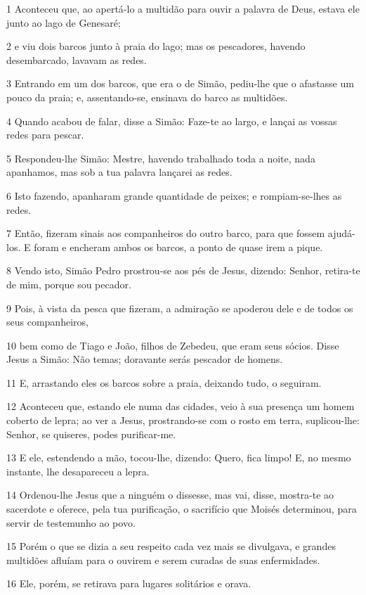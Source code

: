 \par 1 Aconteceu que, ao apertá-lo a multidão para ouvir a palavra de Deus, estava ele junto ao lago de Genesaré;
\par 2 e viu dois barcos junto à praia do lago; mas os pescadores, havendo desembarcado, lavavam as redes.
\par 3 Entrando em um dos barcos, que era o de Simão, pediu-lhe que o afastasse um pouco da praia; e, assentando-se, ensinava do barco as multidões.
\par 4 Quando acabou de falar, disse a Simão: Faze-te ao largo, e lançai as vossas redes para pescar.
\par 5 Respondeu-lhe Simão: Mestre, havendo trabalhado toda a noite, nada apanhamos, mas sob a tua palavra lançarei as redes.
\par 6 Isto fazendo, apanharam grande quantidade de peixes; e rompiam-se-lhes as redes.
\par 7 Então, fizeram sinais aos companheiros do outro barco, para que fossem ajudá-los. E foram e encheram ambos os barcos, a ponto de quase irem a pique.
\par 8 Vendo isto, Simão Pedro prostrou-se aos pés de Jesus, dizendo: Senhor, retira-te de mim, porque sou pecador.
\par 9 Pois, à vista da pesca que fizeram, a admiração se apoderou dele e de todos os seus companheiros,
\par 10 bem como de Tiago e João, filhos de Zebedeu, que eram seus sócios. Disse Jesus a Simão: Não temas; doravante serás pescador de homens.
\par 11 E, arrastando eles os barcos sobre a praia, deixando tudo, o seguiram.
\par 12 Aconteceu que, estando ele numa das cidades, veio à sua presença um homem coberto de lepra; ao ver a Jesus, prostrando-se com o rosto em terra, suplicou-lhe: Senhor, se quiseres, podes purificar-me.
\par 13 E ele, estendendo a mão, tocou-lhe, dizendo: Quero, fica limpo! E, no mesmo instante, lhe desapareceu a lepra.
\par 14 Ordenou-lhe Jesus que a ninguém o dissesse, mas vai, disse, mostra-te ao sacerdote e oferece, pela tua purificação, o sacrifício que Moisés determinou, para servir de testemunho ao povo.
\par 15 Porém o que se dizia a seu respeito cada vez mais se divulgava, e grandes multidões afluíam para o ouvirem e serem curadas de suas enfermidades.
\par 16 Ele, porém, se retirava para lugares solitários e orava.
